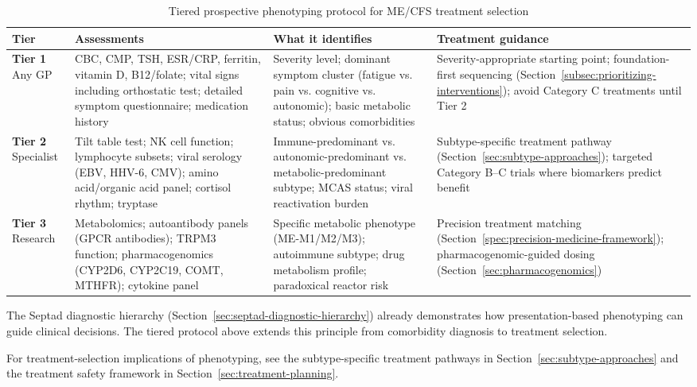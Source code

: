 \begin{table}[htbp]
\centering
\caption{Tiered prospective phenotyping protocol for ME/CFS treatment selection}
\label{tab:phenotyping-tiers}
\small
\begin{tabular}{@{}p{2cm}p{4cm}p{4cm}p{3cm}@{}}
\toprule
\textbf{Tier} & \textbf{Assessments} & \textbf{What it identifies} & \textbf{Treatment guidance} \\
\midrule
\textbf{Tier 1} \newline Any GP &
CBC, CMP, TSH, ESR/CRP, ferritin, vitamin D, B12/folate; vital signs including orthostatic test; detailed symptom questionnaire; medication history &
Severity level; dominant symptom cluster (fatigue vs. pain vs. cognitive vs. autonomic); basic metabolic status; obvious comorbidities &
Severity-appropriate starting point; foundation-first sequencing (Section~\ref{subsec:prioritizing-interventions}); avoid Category C treatments until Tier 2 \\
\midrule
\textbf{Tier 2} \newline Specialist &
Tilt table test; NK cell function; lymphocyte subsets; viral serology (EBV, HHV-6, CMV); amino acid/organic acid panel; cortisol rhythm; tryptase &
Immune-predominant vs. autonomic-predominant vs. metabolic-predominant subtype; MCAS status; viral reactivation burden &
Subtype-specific treatment pathway (Section~\ref{sec:subtype-approaches}); targeted Category B--C trials where biomarkers predict benefit \\
\midrule
\textbf{Tier 3} \newline Research &
Metabolomics; autoantibody panels (GPCR antibodies); TRPM3 function; pharmacogenomics (CYP2D6, CYP2C19, COMT, MTHFR); cytokine panel &
Specific metabolic phenotype (ME-M1/M2/M3); autoimmune subtype; drug metabolism profile; paradoxical reactor risk &
Precision treatment matching (Section~\ref{spec:precision-medicine-framework}); pharmacogenomic-guided dosing (Section~\ref{sec:pharmacogenomics}) \\
\bottomrule
\end{tabular}
\end{table}

The Septad diagnostic hierarchy (Section~\ref{sec:septad-diagnostic-hierarchy}) already demonstrates how presentation-based phenotyping can guide clinical decisions. The tiered protocol above extends this principle from comorbidity diagnosis to treatment selection.

For treatment-selection implications of phenotyping, see the subtype-specific treatment pathways in Section~\ref{sec:subtype-approaches} and the treatment safety framework in Section~\ref{sec:treatment-planning}.

